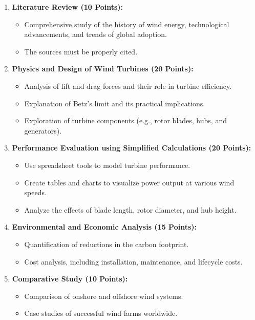 \documentclass[11pt]{article}
\begin{document}
\begin{enumerate}
    \item \textbf{Literature Review (10 Points):}
    \begin{itemize}
        \item Comprehensive study of the history of wind energy, technological advancements, and trends of global adoption.
        \item The sources must be properly cited.
    \end{itemize}

    \item \textbf{Physics and Design of Wind Turbines (20 Points):}
    \begin{itemize}
        \item Analysis of lift and drag forces and their role in turbine efficiency.
        \item Explanation of Betz's limit and its practical implications.
        \item Exploration of turbine components (e.g., rotor blades, hubs, and generators).
    \end{itemize}

    \item \textbf{Performance Evaluation using Simplified Calculations (20 Points):}
    \begin{itemize}
        \item Use spreadsheet tools to model turbine performance.
        \item Create tables and charts to visualize power output at various wind speeds.
        \item Analyze the effects of blade length, rotor diameter, and hub height.
    \end{itemize}

    \item \textbf{Environmental and Economic Analysis (15 Points):}
    \begin{itemize}
        \item Quantification of reductions in the carbon footprint.
        \item Cost analysis, including installation, maintenance, and lifecycle costs.
    \end{itemize}

    \item \textbf{Comparative Study (10 Points):}
    \begin{itemize}
        \item Comparison of onshore and offshore wind systems.
        \item Case studies of successful wind farms worldwide.
    \end{itemize}


\end{enumerate}
\end{document}
